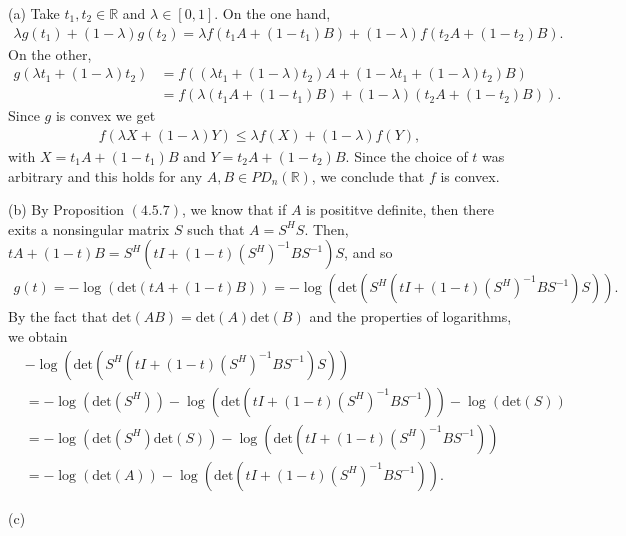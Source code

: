 \documentclass[letterpaper,12pt]{article}
\theoremstyle{definition}
\begin{document}
\begin{spacing}{1.3}{}
	(a)
	Take $t_1, t_2\in\mathbb R$ and $\lambda\in[0,1]$.
	On the one hand, 
	\begin{align*}
	\lambda g(t_1) + (1-\lambda)g(t_2) =
	\lambda f(t_1A+(1-t_1)B) + (1-\lambda)f(t_2A+(1-t_2)B).
	\end{align*}
	On the other, 
	\begin{align*}
	g(\lambda t_1 + (1-\lambda)t_2) &=
	f((\lambda t_1+(1-\lambda)t_2)A + (1-\lambda t_1+(1-\lambda)t_2)B)\\
	&=f(\lambda(t_1A+(1-t_1)B)+(1-\lambda)(t_2A+(1-t_2)B)).
	\end{align*}
	Since $g$ is convex we get
	\begin{align*}
	f(\lambda X+(1-\lambda)Y)\leq\lambda f(X)+(1-\lambda)f(Y),
	\end{align*}
	with $X=t_1A+(1-t_1)B$ and $Y=t_2A+(1-t_2)B$.
	Since the choice of $t$ was arbitrary and this holds for any $A,B\in PD_n(\mathbb R)$,
	we conclude that $f$ is convex.
	
	(b)
	By Proposition $(4.5.7)$, we know that if $A$ is posititve definite, then there exits a nonsingular matrix
	$S$ such that $A=S^HS$. Then, $tA+(1-t)B=S^H(tI+(1-t)(S^H)^{-1}BS^{-1})S$,
	and so
	\begin{align*}
	g(t) = -\log(\text{det}(tA+(1-t)B))=
	-\log(\text{det}(S^H(tI+(1-t)(S^H)^{-1}BS^{-1})S)).
	\end{align*}
	By the fact that $\text{det}(AB)=\text{det}(A)\text{det}(B)$ and the properties of logarithms,
	we obtain
	\begin{align*}
	&-\log(\text{det}(S^H(tI+(1-t)(S^H)^{-1}BS^{-1})S))\\
	&= -\log(\text{det}(S^H)) - \log(\text{det}(tI+(1-t)(S^H)^{-1}BS^{-1})) - \log(\text{det}(S))\\
	&=-\log(\text{det}(S^H)\text{det}(S)) - \log(\text{det}(tI+(1-t)(S^H)^{-1}BS^{-1}))\\
	&=-\log(\text{det}(A))- \log(\text{det}(tI+(1-t)(S^H)^{-1}BS^{-1})).
	\end{align*}
	
	(c)
	

\end{spacing}
\end{document}
